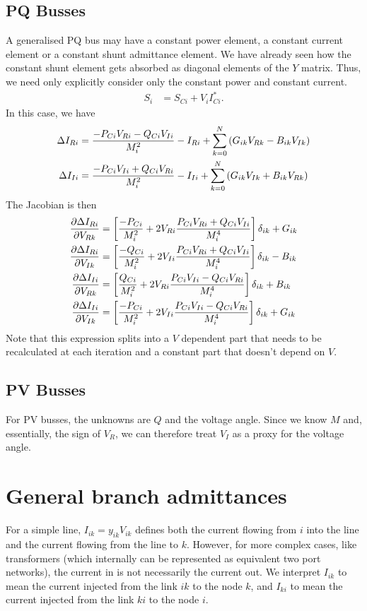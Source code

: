 \documentclass[11pt]{article}
\begin{document}
\subsection{PQ Busses}
A generalised PQ bus may have a constant power element, a constant current element or a constant shunt admittance element. We have already seen how the constant shunt element gets absorbed as diagonal elements of the $Y$ matrix. Thus, we need only explicitly consider only the constant power and constant current.
\begin{align}
S_i &= S_{Ci} + V_iI^*_{Ci}.
\end{align}
In this case, we have
\begin{align}
\Delta I_{Ri} &= \frac{-P_{Ci}V_{Ri}-Q_{Ci}V_{Ii}}{M^2_i} - I_{Ri} + \sum_{k=0}^N\left(G_{ik}V_{Rk} - B_{ik}V_{Ik}\right)\notag \\
\Delta I_{Ii} &= \frac{-P_{Ci}V_{Ii}+Q_{Ci}V_{Ri}}{M^2_i} - I_{Ii} + \sum_{k=0}^N\left(G_{ik}V_{Ik} + B_{ik}V_{Rk}\right)
\end{align}
The Jacobian is then
\begin{align}
\frac{\partial \Delta I_{Ri}}{\partial V_{Rk}} &= \left[\frac{-P_{Ci}}{M^2_i} + 2V_{Ri}\frac{P_{Ci}V_{Ri} + Q_{Ci}V_{Ii}}{M^4_i}\right]\delta_{ik}+G_{ik} \notag \\
\frac{\partial \Delta I_{Ri}}{\partial V_{Ik}} &= \left[\frac{-Q_{Ci}}{M^2_i} + 2V_{Ii}\frac{P_{Ci}V_{Ri} + Q_{Ci}V_{Ii}}{M^4_i}\right]\delta_{ik}-B_{ik} \notag \\
\frac{\partial \Delta I_{Ii}}{\partial V_{Rk}} &= \left[\frac{Q_{Ci}}{M^2_i} + 2V_{Ri}\frac{P_{Ci}V_{Ii} - Q_{Ci}V_{Ri}}{M^4_i} \right]\delta_{ik}+B_{ik} \notag \\
\frac{\partial \Delta I_{Ii}}{\partial V_{Ik}} &= \left[\frac{-P_{Ci}}{M^2_i} + 2V_{Ii}\frac{P_{Ci}V_{Ii} - Q_{Ci}V_{Ri}}{M^4_i}\right]\delta_{ik}+G_{ik}
\end{align}
Note that this expression splits into a $V$ dependent part that needs to be recalculated at each iteration and a constant part that doesn't depend on $V$.

\subsection{PV Busses}
For PV busses, the unknowns are $Q$ and the voltage angle. Since we know $M$ and, essentially, the sign of $V_R$, we can therefore treat $V_I$ as a proxy for the voltage angle. 

\section{General branch admittances}
For a simple line, $I_{ik} = y_{ik}V_{ik}$ defines both the current flowing from $i$ into the line and the current flowing from the line to $k$. However, for more complex cases, like transformers (which internally can be represented as equivalent two port networks), the current in is not necessarily the current out. We interpret $I_{ik}$ to mean the current injected from the link $ik$ to the node $k$, and $I_{ki}$ to mean the current injected from the link $ki$ to the node $i$.
\end{document}

